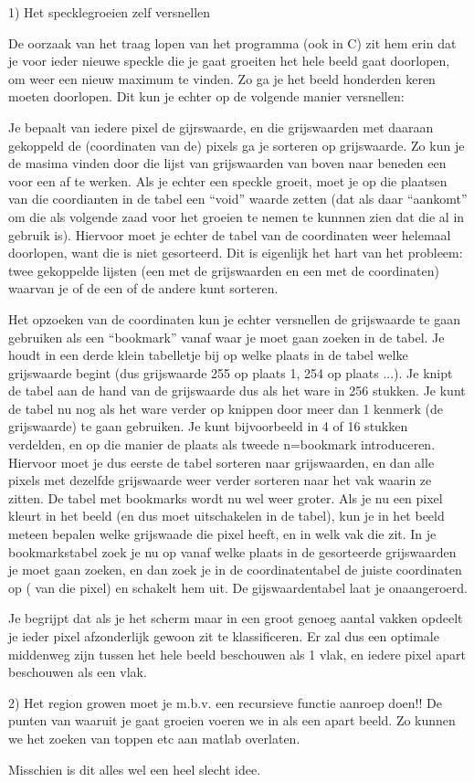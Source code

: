 1) Het specklegroeien zelf versnellen

De oorzaak van het traag lopen van het programma (ook in C) zit hem erin dat je voor ieder nieuwe speckle die je gaat groeiten het hele beeld gaat doorlopen, om weer een nieuw maximum te vinden. Zo ga je het beeld honderden keren moeten doorlopen. Dit kun je echter op de volgende manier versnellen:

Je bepaalt van iedere pixel de gijrswaarde, en die grijswaarden met daaraan gekoppeld de (coordinaten van de) pixels ga je sorteren op grijswaarde. Zo kun je de masima vinden door die lijst van grijswaarden van boven naar beneden een voor een af te werken. 
Als je echter een speckle groeit, moet je op die plaatsen van die coordianten in de tabel een ``void'' waarde zetten (dat als daar ``aankomt'' om die als volgende zaad voor het groeien te nemen te kunnnen zien dat die al in gebruik is). Hiervoor moet je echter de tabel van de coordinaten weer helemaal doorlopen, want die is niet gesorteerd. Dit is eigenlijk het hart van het probleem: twee gekoppelde lijsten (een met de grijswaarden en een met de coordinaten) waarvan je of de een of de andere kunt sorteren.

Het opzoeken van de coordinaten kun je echter versnellen de grijswaarde te gaan gebruiken als een ``bookmark'' vanaf waar je moet gaan zoeken in de tabel.
Je houdt in een derde klein tabelletje bij op welke plaats in de tabel welke grijswaarde begint (dus grijswaarde 255 op plaats 1, 254 op plaats ...). Je knipt de tabel aan de hand van de grijswaarde dus als het ware in 256 stukken.
Je kunt de tabel nu nog als het ware verder op knippen door meer dan 1 kenmerk (de grijswaarde) te gaan gebruiken. Je kunt bijvoorbeeld in 4 of 16 stukken verdelden, en op die manier de plaats als tweede n=bookmark introduceren.
Hiervoor moet je dus eerste de tabel sorteren naar grijswaarden, en dan alle pixels met dezelfde grijswaarde weer verder sorteren naar het vak waarin ze zitten. De tabel met bookmarks wordt nu wel weer groter. Als je nu een pixel kleurt in het beeld (en dus moet uitschakelen in de tabel), kun je in het beeld meteen bepalen welke grijswaade die pixel heeft, en in welk vak die zit. In je bookmarkstabel zoek je nu op vanaf welke plaats in de gesorteerde grijswaarden je moet gaan zoeken, en dan zoek je in de coordinatentabel de juiste coordinaten op ( van die pixel) en schakelt hem uit. De gijswaardentabel laat je onaangeroerd.

Je begrijpt dat als je het scherm maar in een groot genoeg aantal vakken opdeelt je ieder pixel afzonderlijk gewoon zit te klassificeren. Er zal dus een optimale middenweg zijn tussen het hele beeld beschouwen als 1 vlak, en iedere pixel apart beschouwen als een vlak.

2) Het region growen moet je m.b.v. een recursieve functie aanroep doen!!
De punten van waaruit je gaat groeien voeren we in als een apart beeld. Zo kunnen we het zoeken van toppen etc aan matlab overlaten.

Misschien is dit alles wel een heel slecht idee.